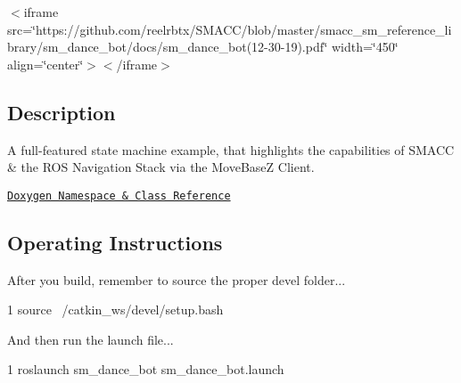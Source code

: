 $<$iframe src=\char`\"{}https\+://github.\+com/reelrbtx/\+S\+M\+A\+C\+C/blob/master/smacc\+\_\+sm\+\_\+reference\+\_\+library/sm\+\_\+dance\+\_\+bot/docs/sm\+\_\+dance\+\_\+bot(12-\/30-\/19).\+pdf\char`\"{} width=\char`\"{}450\char`\"{} align=\char`\"{}center\char`\"{}$>$$<$/iframe$>$

\subsection*{Description}

A full-\/featured state machine example, that highlights the capabilities of S\+M\+A\+CC \& the R\+OS Navigation Stack via the Move\+BaseZ Client.~\newline


\href{https://reelrbtx.github.io/SMACC/master/html/namespacesm__dance__bot.html}{\tt Doxygen Namespace \& Class Reference}

\subsection*{Operating Instructions}

After you build, remember to source the proper devel folder...


\begin{DoxyCode}
1 source ~/catkin\_ws/devel/setup.bash
\end{DoxyCode}


And then run the launch file...


\begin{DoxyCode}
1 roslaunch sm\_dance\_bot sm\_dance\_bot.launch
\end{DoxyCode}
 